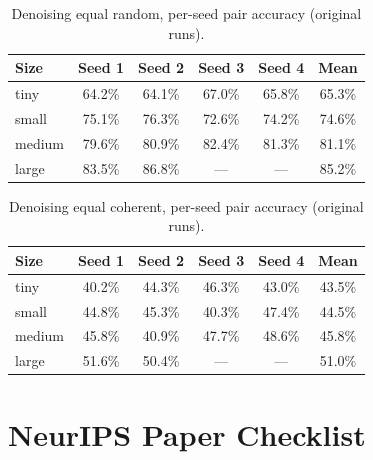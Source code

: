 \documentclass{article}
\begin{document}
\begin{table}[ht]
\centering
\small
\begin{tabular}{lccccc}
\toprule
Size & Seed 1 & Seed 2 & Seed 3 & Seed 4 & Mean \\
\midrule
tiny   & 64.2\% & 64.1\% & 67.0\% & 65.8\% & 65.3\% \\
small  & 75.1\% & 76.3\% & 72.6\% & 74.2\% & 74.6\% \\
medium & 79.6\% & 80.9\% & 82.4\% & 81.3\% & 81.1\% \\
large  & 83.5\% & 86.8\% & ---    & ---    & 85.2\% \\
\bottomrule
\end{tabular}
\caption{Denoising equal random, per-seed pair accuracy (original runs).}
\label{tab:seeds_random}
\end{table}

\begin{table}[ht]
\centering
\small
\begin{tabular}{lccccc}
\toprule
Size & Seed 1 & Seed 2 & Seed 3 & Seed 4 & Mean \\
\midrule
tiny   & 40.2\% & 44.3\% & 46.3\% & 43.0\% & 43.5\% \\
small  & 44.8\% & 45.3\% & 40.3\% & 47.4\% & 44.5\% \\
medium & 45.8\% & 40.9\% & 47.7\% & 48.6\% & 45.8\% \\
large  & 51.6\% & 50.4\% & ---    & ---    & 51.0\% \\
\bottomrule
\end{tabular}
\caption{Denoising equal coherent, per-seed pair accuracy (original runs).}
\label{tab:seeds_coherent}
\end{table}

\clearpage
\section*{NeurIPS Paper Checklist}
\end{document}
